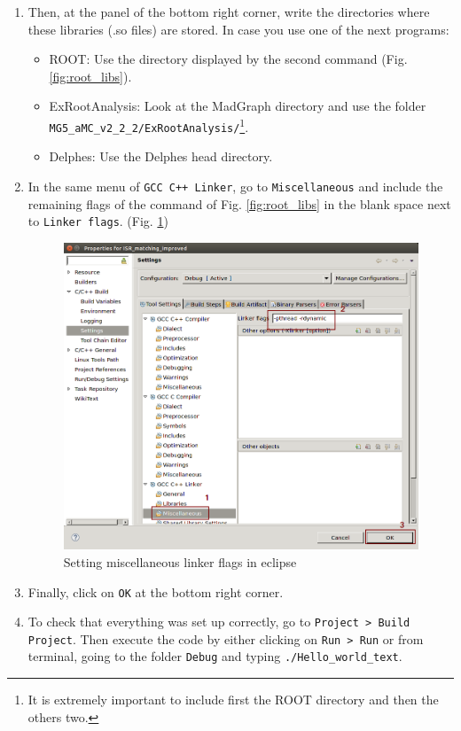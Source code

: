 \documentclass[12pt, oneside]{book}              %
\begin{document}
\begin{enumerate}
\item Then, at the panel of the bottom right corner, write the directories
where these libraries (.so files) are stored. In case you use one of the next
programs:

\begin{itemize}
	\item ROOT: Use the directory displayed by the second command (Fig. \ref{fig:root_libs}).
	\item ExRootAnalysis: Look at the MadGraph directory and use the folder	\texttt{MG5\_aMC\_v2\_2\_2/ExRootAnalysis/}\footnote{It is extremely important to include
	first the ROOT directory and then the others two.}.
	\item Delphes: Use the Delphes head directory.
\end{itemize}

\item In the same menu of \texttt{GCC C++ Linker}, go to \texttt{Miscellaneous} and 
include the remaining flags of the command of Fig. \ref{fig:root_libs} in the blank
space next to \texttt{Linker flags}. (Fig. \ref{fig:Misce_linker_flags})

\begin{figure}[h!]
\centering
\includegraphics[width=0.7\linewidth]{./Imags_Doc/Misce_linker_flags}
\caption[Setting miscellaneous linker flags in eclipse]{Setting miscellaneous linker flags in eclipse}
\label{fig:Misce_linker_flags}
\end{figure}


\item Finally, click on \texttt{OK} at the bottom right corner.

\item To check that everything was set up correctly, go to \texttt{Project > 
	Build Project}. Then execute the code by either clicking on \texttt{Run > Run}
	or from terminal, going to the folder \texttt{Debug} and typing
	\texttt{./Hello\_world\_text}.
\end{enumerate}
\end{document}
